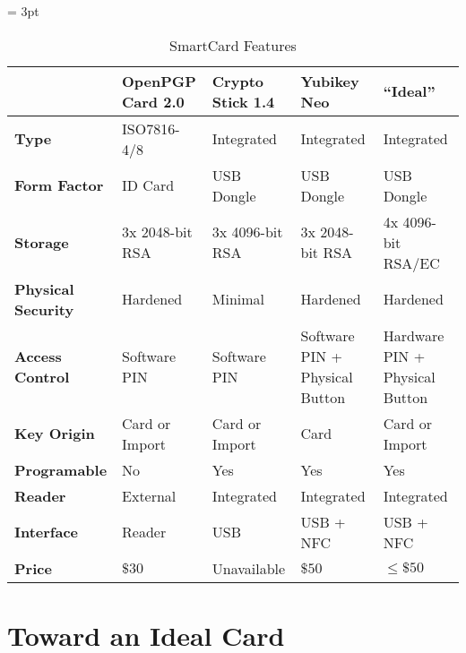 \documentclass[11pt, twocolumn]{article}
\begin{document}
\begin{table*}[!htb]
  \vspace{3ex}
  \begin{center}
    \tabulinesep = 3pt
    \begin{tabu} to \textwidth
      { | X[1,c,m]
        | X[1,c,m]
        | X[1,c,m]
        | X[1,c,m]
        | X[1,c,m]
        | }
      \hline
      &
      \textbf{OpenPGP Card 2.0} &
      \textbf{Crypto Stick 1.4} &
      \textbf{Yubikey Neo} &
      \textbf{``Ideal''}
      \\ \hline
      \textbf{Type}
      & ISO7816-4/8
      & Integrated
      & Integrated
      & Integrated
      \\ \hline
      \textbf{Form Factor}
      & ID Card
      & USB Dongle
      & USB Dongle
      & USB Dongle
      \\ \hline
      \textbf{Storage}
      & 3x 2048-bit RSA
      & 3x 4096-bit RSA
      & 3x 2048-bit RSA
      & 4x 4096-bit RSA/EC
      \\ \hline
      \textbf{Physical Security}
      & Hardened
      & Minimal
      & Hardened
      & Hardened
      \\ \hline
      \textbf{Access Control}
      & Software PIN
      & Software PIN
      & Software PIN + Physical Button
      & Hardware PIN + Physical Button
      \\ \hline
      \textbf{Key Origin}
      & Card or Import
      & Card or Import
      & Card
      & Card or Import
      \\ \hline
      \textbf{Programable}
      & No
      & Yes
      & Yes
      & Yes
      \\ \hline
      \textbf{Reader}
      & External
      & Integrated
      & Integrated
      & Integrated
      \\ \hline
      \textbf{Interface}
      & Reader
      & USB
      & USB + NFC
      & USB + NFC
      \\ \hline
      \textbf{Price}
      & $\$30$
      & Unavailable
      & $\$50$
      & $\le\$50$
      \\ \hline
      \end{tabu}
  \end{center}
  \caption{SmartCard Features}
  \label{tab:scfeatures}
\end{table*}

\section{Toward an Ideal Card}
\label{sec:ideal}
\end{document}
